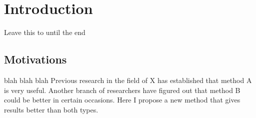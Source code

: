 \chapter{Introduction}
\label{cha:introduction}

Leave this to until the end

\section{Motivations}
\label{sec:motivations}

blah blah blah
Previous research\cite{Fisher:1954} \cite{Robbins:1951aa} \cite{Knight:1921} in the field of X has established that method A is very useful.
Another branch of researchers\cite{Wright:1921aa} \cite{Caratheodory:1909aa} \cite{Gibbs:1902} \cite{Clausius:1857} have figured out that method B could be better in certain occasions.
Here I propose a new method that gives results better than both types.

